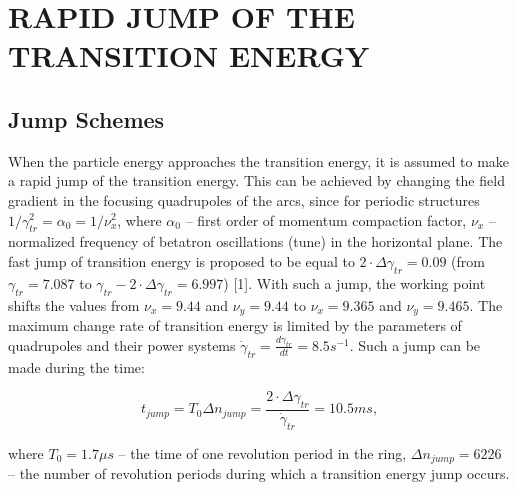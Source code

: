 \documentclass[a4paper,
               keeplastbox,   %
               ]{jacow}
\begin{document}
\section{RAPID JUMP OF THE TRANSITION ENERGY}
\subsection{Jump Schemes}
\par When the particle energy approaches the transition energy, it is assumed to make a rapid jump of the transition energy. This can be achieved by changing the field gradient in the focusing quadrupoles of the arcs, since for periodic structures $1/\gamma_{tr}^{2}=\alpha_{0}=1/\nu_{x}^{2}$, where $\alpha_{0}$ – first order of momentum compaction factor, $\nu_{x}$ – normalized frequency of betatron oscillations (tune) in the horizontal plane. The fast jump of transition energy is proposed to be equal to $2\cdot\Delta\gamma_{tr}=0.09$ (from $\gamma_{tr}=7.087$ to $\gamma_{tr}-2\cdot\Delta\gamma_{tr}=6.997$) [1]. With such a jump, the working point shifts the values from $\nu_{x}=9.44$ and $\nu_{y}=9.44$ to  $\nu_{x}=9.365$ and $\nu_{y}=9.465$. The maximum change rate of transition energy is limited by the parameters of quadrupoles and their power systems $\dot\gamma_{tr}=\frac{d\gamma_{tr}}{dt}=8.5 s^{-1}$. Such a jump can be made during the time:

\begin{equation}\label{eq:jump_time}
t_{jump}=T_{0} \Delta n_{jump}=\frac{2\cdot\Delta\gamma_{tr}}{\dot{\gamma}_{tr}}=10.5 ms,
\end{equation}

where $T_{0}=1.7 \mu s$ – the time of one revolution period in the ring, $\Delta n_{jump}= 6226$ – the number of revolution periods during which a transition energy jump occurs.
\end{document}
